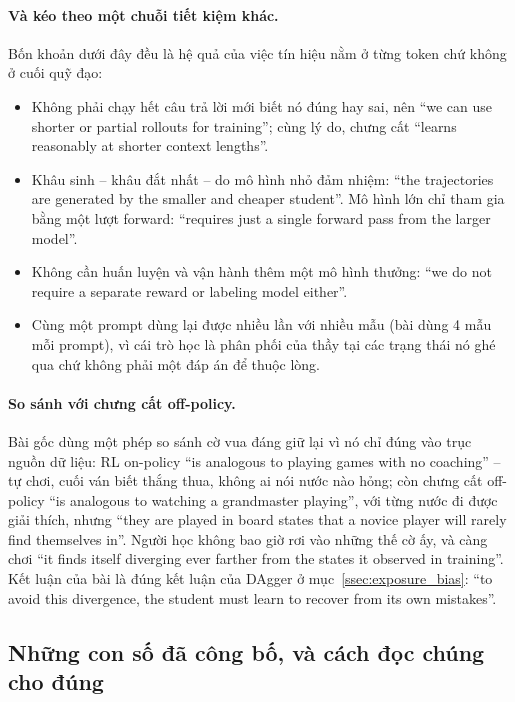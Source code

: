 \paragraph{Và kéo theo một chuỗi tiết kiệm khác.} Bốn khoản dưới đây đều là hệ quả của việc tín hiệu nằm ở từng token chứ không ở cuối quỹ đạo:
\begin{itemize}
	\item Không phải chạy hết câu trả lời mới biết nó đúng hay sai, nên ``we can use shorter or partial rollouts for training''; cùng lý do, chưng cất ``learns reasonably at shorter context lengths''.
	\item Khâu sinh -- khâu đắt nhất -- do mô hình nhỏ đảm nhiệm: ``the trajectories are generated by the smaller and cheaper student''. Mô hình lớn chỉ tham gia bằng một lượt forward: ``requires just a single forward pass from the larger model''.
	\item Không cần huấn luyện và vận hành thêm một mô hình thưởng: ``we do not require a separate reward or labeling model either''.
	\item Cùng một prompt dùng lại được nhiều lần với nhiều mẫu (bài dùng 4 mẫu mỗi prompt), vì cái trò học là phân phối của thầy tại các trạng thái nó ghé qua chứ không phải một đáp án để thuộc lòng.
\end{itemize}

\paragraph{So sánh với chưng cất off-policy.} Bài gốc dùng một phép so sánh cờ vua đáng giữ lại vì nó chỉ đúng vào trục nguồn dữ liệu: RL on-policy ``is analogous to playing games with no coaching'' -- tự chơi, cuối ván biết thắng thua, không ai nói nước nào hỏng; còn chưng cất off-policy ``is analogous to watching a grandmaster playing'', với từng nước đi được giải thích, nhưng ``they are played in board states that a novice player will rarely find themselves in''. Người học không bao giờ rơi vào những thế cờ ấy, và càng chơi ``it finds itself diverging ever farther from the states it observed in training''. Kết luận của bài là đúng kết luận của DAgger ở mục~\ref{ssec:exposure_bias}: ``to avoid this divergence, the student must learn to recover from its own mistakes''.

\subsection{Những con số đã công bố, và cách đọc chúng cho đúng}
\label{ssec:opd_numbers}

